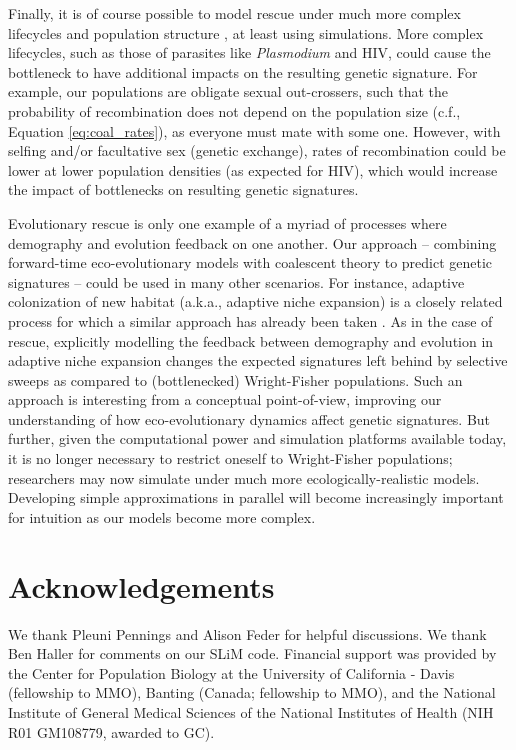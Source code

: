 \documentclass[]{article}
\begin{document}
Finally, it is of course possible to model rescue under much more complex lifecycles and population structure \citep[e.g., as expected for the evolution of malarial drug resistance;][]{kim2014population}, at least using simulations. 
More complex lifecycles, such as those of parasites like \textit{Plasmodium} and HIV, could cause the bottleneck to have additional impacts on the resulting genetic signature. 
For example, our populations are obligate sexual out-crossers, such that the probability of recombination does not depend on the population size (c.f., Equation \ref{eq:coal_rates}), as everyone must mate with some one. 
However, with selfing and/or facultative sex (genetic exchange), rates of recombination could be lower at lower population densities (as expected for HIV), which would increase the impact of bottlenecks on resulting genetic signatures.

Evolutionary rescue is only one example of a myriad of processes where demography and evolution feedback on one another. 
Our approach -- combining forward-time eco-evolutionary models with coalescent theory to predict genetic signatures -- could be used in many other scenarios.
For instance, adaptive colonization of new habitat (a.k.a., adaptive niche expansion) is a closely related process for which a similar approach has already been taken \citep{kim2010signatures}.
As in the case of rescue, explicitly modelling the feedback between demography and evolution in adaptive niche expansion changes the expected signatures left behind by selective sweeps as compared to (bottlenecked) Wright-Fisher populations.
Such an approach is interesting from a conceptual point-of-view, improving our understanding of how eco-evolutionary dynamics affect genetic signatures.
But further, given the computational power and simulation platforms available today, it is no longer necessary to restrict oneself to Wright-Fisher populations; researchers may now simulate under much more ecologically-realistic models.
Developing simple approximations in parallel will become increasingly important for intuition as our models become more complex.

\section*{Acknowledgements}
We thank Pleuni Pennings and Alison Feder for helpful discussions.
We thank Ben Haller for comments on our SLiM code.
Financial support was provided by the Center for Population Biology at the University of California - Davis (fellowship to MMO), Banting (Canada; fellowship to MMO), and the National Institute of General Medical Sciences of the National Institutes of Health (NIH R01 GM108779, awarded to GC).
\end{document}
